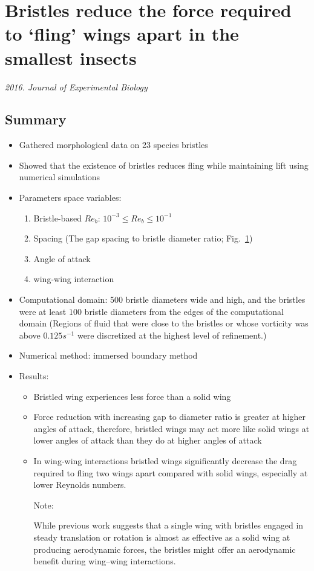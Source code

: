 \documentclass[preprint, letterpaper, nobibnotes, aps, superscriptaddress,prb]{revtex4-1}
\begin{document}
\section{Bristles reduce the force required to ‘fling’ wings apart in the smallest insects}

\textit{2016. Journal of Experimental Biology}

\subsection{Summary}
\begin{itemize}
\item
Gathered morphological data on 23 species bristles
\item 
Showed that the existence of bristles reduces fling while maintaining lift using numerical simulations
\item
Parameters space variables: 
\begin{enumerate}
\item 
Bristle-based $Re_{b}$: $10^{−3}\leq Re_b \leq 10^{−1}$
\item 
Spacing (The gap spacing to bristle diameter ratio; Fig.~\ref{fig2})
\begin{figure}[H]
  \centering {}
  \caption{}\label{fig2}
\end{figure}

\item 
Angle of attack
\item 
wing-wing interaction
\end{enumerate}
\item
Computational domain: 500 bristle diameters wide and high, and the bristles were at least $100$ bristle diameters from the edges of the computational domain (Regions of fluid that were close to the bristles or whose vorticity was above $0.125 s^{−1}$ were discretized at the highest level of refinement.)
\item
Numerical method: immersed boundary method
\item
Results: 
\begin{itemize}
\item Bristled wing experiences less force than a solid wing
\item Force reduction with increasing gap to diameter ratio is greater at higher angles of attack, therefore, bristled wings may act more like solid wings at lower angles of attack than they do at higher angles of attack 
\item In wing-wing interactions bristled wings significantly decrease the drag required to fling two wings apart compared with solid wings, especially at lower Reynolds numbers.

Note:

While previous work suggests that a single wing with bristles engaged in steady translation or rotation is almost as effective as a solid wing at producing aerodynamic forces, the bristles might offer an aerodynamic benefit during wing–wing interactions.
\end{itemize}
\end{itemize}
\end{document}

